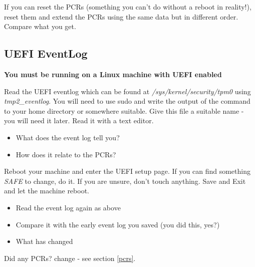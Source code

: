 \documentclass[11pt,a4paper]{article}
\begin{document}
If you can reset the PCRs (something you can't do without a reboot in reality!), reset them and extend the PCRs using the same data but in different order. Compare what you get.


\subsection{UEFI EventLog}
\textbf{You must be running on a Linux machine with UEFI enabled}

Read the UEFI eventlog which can be found at \textit{/sys/kernel/security/tpm0} using \textit{tmp2\_eventlog}. You will need to use sudo and write the output of the command to your home directory or somewhere suitable. Give this file a suitable name - you will need it later. Read it with a text editor.

\begin{itemize}
 \item What does the event log tell you?  
 \item How does it relate to the PCRs?
\end{itemize}

Reboot your machine and enter the UEFI setup page. If you can find something \textit{SAFE} to change, do it. If you are unsure, don't touch anything. Save and Exit and let the machine reboot.

\begin{itemize}
 \item Read the event log again as above
 \item Compare it with the early event log you saved (you did this, yes?)
 \item What has changed
\end{itemize}

Did any PCRs? change - see section \ref{pcrs}.
\end{document}
